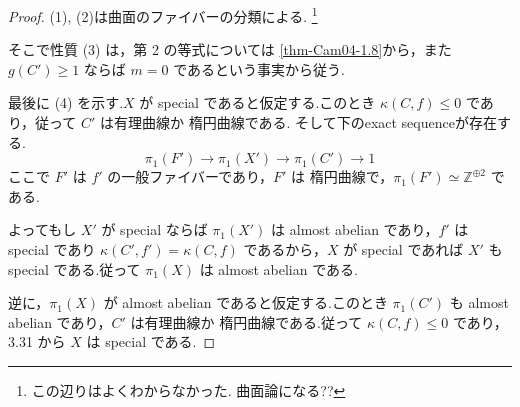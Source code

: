 \documentclass[dvipdfmx,a4paper,11pt]{article} %
\theoremstyle{definition}
\theoremstyle{remark}
\numberwithin{equation}{section}
\begin{document}
\begin{proof}


(1), (2)は曲面のファイバーの分類による. \footnote{この辺りはよくわからなかった. 曲面論になる??}

そこで性質 (3) は，第 2 の等式については \ref{thm-Cam04-1.8}から，また \(g(C')\geq 1\) ならば \(m=0\) であるという事実から従う.

最後に (4) を示す.\(X\) が special であると仮定する.このとき \(\kappa(C,f)\leq 0\) であり，従って \(C'\) は有理曲線か 楕円曲線である.
そして下のexact sequenceが存在する. 
\[
\pi_1(F')\to\pi_1(X')\to\pi_1(C')\to 1
\]
ここで \(F'\) は \(f'\) の一般ファイバーであり，\(F'\) は 楕円曲線で，\(\pi_1(F')\simeq \mathbb{Z}^{\oplus 2}\) である.

よってもし \(X'\) が special ならば \(\pi_1(X')\) は almost abelian であり，\(f'\) は special であり \(\kappa(C',f')=\kappa(C,f)\) であるから，\(X\) が special であれば \(X'\) も special である.従って \(\pi_1(X)\) は almost abelian である.

逆に，\(\pi_1(X)\) が almost abelian であると仮定する.このとき \(\pi_1(C')\) も almost abelian であり，\(C'\) は有理曲線か 楕円曲線である.従って \(\kappa(C,f)\leq 0\) であり，3.31 から \(X\) は special である.
\end{proof}
\end{document}
